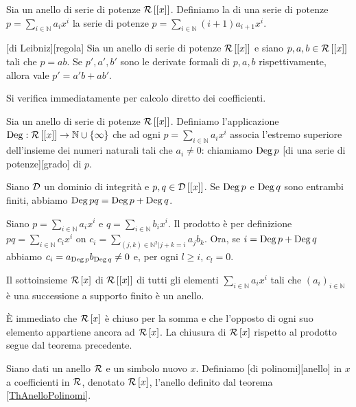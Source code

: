 \begin{Definition}
	Sia un anello di serie di potenze $\mathcal{R} \left [ \left [ x \right ] \right ]$. Definiamo la  di una serie di potenze $p = \sum_{i \in \mathbb{N}} a_i x^i$ la serie di potenze $p = \sum_{i \in \mathbb{N}} (i + 1)a_{i + 1} x^i$.
\end{Definition}
\begin{Theorem}
	[di Leibniz][regola] Sia un anello di serie di potenze $\mathcal{R} \left [ \left [ x \right ] \right ]$ e siano $p,a,b \in \mathcal{R} \left [ \left [ x \right ] \right ]$ tali che $p = ab$. Se $p',a',b'$ sono le derivate formali di $p, a, b$ rispettivamente, allora vale $p' = a'b + ab'$.
\end{Theorem}
\Proof Si verifica immediatamente per calcolo diretto dei coefficienti. \EndProof
\begin{Definition}
	Sia un anello di serie di potenze $\mathcal{R} \left [ \left [ x \right ] \right ]$. Definiamo l'applicazione $\operatorname{Deg}: \mathcal{R} \left [ \left [ x \right ] \right ] \rightarrow \mathbb{N} \cup \lbrace \infty \rbrace$ che ad ogni $p = \sum_{i \in \mathbb{N}} a_ix^i$ associa l'estremo superiore dell'insieme dei numeri naturali tali che $a_i \neq 0$: chiamiamo $\operatorname{Deg} p$ [di una serie di potenze][grado] di $p$.
\end{Definition}
\begin{Theorem}
	Siano $\mathcal{D}$ un dominio di integrit\`a e $p, q \in \mathcal{D} \left [ \left [ x \right ] \right ]$. Se $\operatorname{Deg} p$ e $\operatorname{Deg} q$ sono entrambi finiti, abbiamo $\operatorname{Deg} pq = \operatorname{Deg} p + \operatorname{Deg} q$.
\end{Theorem}
\Proof Siano $p = \sum_{i \in \mathbb{N}} a_ix^i$ e $q = \sum_{i \in \mathbb{N}} b_ix^i$. Il prodotto \`e per definizione $pq = \sum_{i \in \mathbb{N}} c_ix^i$ on $c_i = \sum_{(j,k) \in \mathbb{N}^2 | j + k = i} a_jb_k$. Ora, se $i = \operatorname{Deg} p + \operatorname{Deg} q$ abbiamo $c_i = a_{\operatorname{Deg} p}b_{\operatorname{Deg} q} \neq 0$ e, per ogni $l \geq i$, $c_l = 0$.\EndProof
\begin{Theorem}\label{ThAnelloPolinomi}
	Il sottoinsieme $\mathcal{R} \left [ x \right ]$ di $\mathcal{R} \left [ \left [ x \right ] \right ]$ di tutti gli elementi $\sum_{i \in \mathbb{N}} a_ix^i$ tali che $(a_i)_{i \in \mathbb{N}}$ \`e una successione a supporto finito \`e un anello.
\end{Theorem}
\Proof \`E immediato che $\mathcal{R} \left [ x \right ]$ \`e chiuso per la somma e che l'opposto di ogni suo elemento appartiene ancora ad $\mathcal{R} \left [ x \right ]$. La chiusura di $\mathcal{R} \left [ x \right ]$ rispetto al prodotto segue dal teorema precedente. \EndProof
\begin{Definition}
	Siano dati un anello $\mathcal{R}$ e un simbolo nuovo $x$. Definiamo [di polinomi][anello] in $x$ a coefficienti in $\mathcal{R}$, denotato $\mathcal{R} \left [ x \right ]$, l'anello definito dal teorema \ref{ThAnelloPolinomi}.
\end{Definition}
